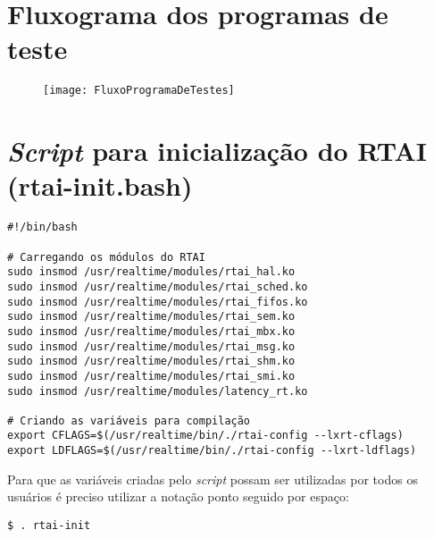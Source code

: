 \chapter{Fluxograma dos programas de teste}
\label{cap:fluxograma}
\begin{figure}[!htb]
    \centering
    \texttt{[image: FluxoProgramaDeTestes]}
    \label{fluxograma}
\end{figure}

\chapter{\textit{Script} para inicialização do RTAI (rtai-init.bash)}
\label{cap:script}
\lstset{language=bash}
\begin{lstlisting}[frame=single]
#!/bin/bash

# Carregando os módulos do RTAI
sudo insmod /usr/realtime/modules/rtai_hal.ko
sudo insmod /usr/realtime/modules/rtai_sched.ko
sudo insmod /usr/realtime/modules/rtai_fifos.ko
sudo insmod /usr/realtime/modules/rtai_sem.ko
sudo insmod /usr/realtime/modules/rtai_mbx.ko
sudo insmod /usr/realtime/modules/rtai_msg.ko
sudo insmod /usr/realtime/modules/rtai_shm.ko
sudo insmod /usr/realtime/modules/rtai_smi.ko
sudo insmod /usr/realtime/modules/latency_rt.ko

# Criando as variáveis para compilação
export CFLAGS=$(/usr/realtime/bin/./rtai-config --lxrt-cflags)
export LDFLAGS=$(/usr/realtime/bin/./rtai-config --lxrt-ldflags)
\end{lstlisting}

Para que as variáveis criadas pelo \textit{script} possam ser utilizadas por todos os usuários é preciso utilizar a notação ponto seguido por espaço:

\begin{lstlisting}[frame=single]
$ . rtai-init
\end{lstlisting}